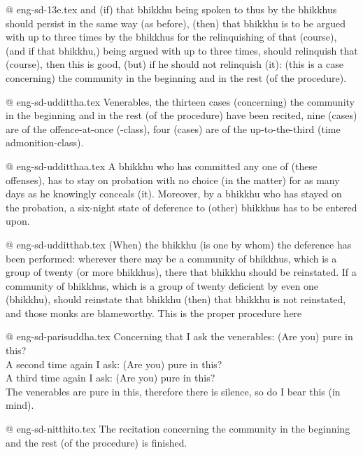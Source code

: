 @ eng-sd-13e.tex
and (if) that bhikkhu being spoken to thus by the bhikkhus should persist in the same way (as before), (then) that bhikkhu is to be argued with up to three times by the bhikkhus for the relinquishing of that (course), (and if that bhikkhu,) being argued with up to three times, should relinquish that (course), then this is good, (but) if he should not relinquish (it): (this is a case concerning) the community in the beginning and in the rest (of the procedure).

@ eng-sd-uddittha.tex
Venerables, the thirteen cases (concerning) the community in the beginning and in the rest (of the procedure) have been recited, nine (cases) are of the offence-at-once (-class), four (cases) are of the up-to-the-third (time admonition-class).

@ eng-sd-udditthaa.tex
A bhikkhu who has committed any one of (these offenses), has to stay on probation with no choice (in the matter) for as many days as he knowingly conceals (it). Moreover, by a bhikkhu who has stayed on the probation, a six-night state of deference to (other) bhikkhus has to be entered upon.

@ eng-sd-udditthab.tex
(When) the bhikkhu (is one by whom) the deference has been performed: wherever there may be a community of bhikkhus, which is a group of twenty (or more bhikkhus), there that bhikkhu should be reinstated. If a community of bhikkhus, which is a group of twenty deficient by even one (bhikkhu), should reinstate that bhikkhu (then) that bhikkhu is not reinstated, and those monks are blameworthy. This is the proper procedure here

@ eng-sd-parisuddha.tex
Concerning that I ask the venerables: (Are you) pure in this?\\
A second time again I ask: (Are you) pure in this?\\
A third time again I ask: (Are you) pure in this?\\
The venerables are pure in this, therefore there is silence, so do I bear this (in mind).

@ eng-sd-nitthito.tex
The recitation concerning the community in the beginning and the rest (of the procedure) is finished.
